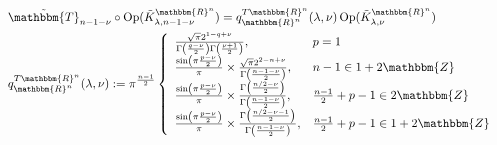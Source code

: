 \documentclass[8pt,pdf,notes]{beamer}
\newcommand{\assign}{:=}
\newcommand{\tmop}[1]{\ensuremath{\operatorname{#1}}}
\theoremstyle{mystyle}
\begin{document}
\begin{frame}
	\begin{theorem}
		\begin{eqnarray*}& \tilde{\mathbbm{T}}_{n - 1 - \nu} \circ \tmop{Op} ( \tilde{K}_{\lambda,
    n - 1 - \nu}^{\mathbbm{R}^n}) = q^{T\mathbbm{R}^n}_{\mathbbm{R}^n} (
    \lambda, \nu) \tmop{Op} ( \tilde{K}_{\lambda, \nu}^{\mathbbm{R}^n}) & 
    \nonumber\\
    & q^{T\mathbbm{R}^n}_{\mathbbm{R}^n} ( \lambda, \nu) \assign \pi^{\frac{n
    - 1}{2}} \left\{ \begin{array}{ll}
      \frac{\sqrt{\pi} 2^{1 - q + \nu}}{\Gamma \left( \frac{q - \nu}{2}
      \right) \Gamma \left( \frac{\nu + 1}{2} \right)}, & p = 1\\
      \frac{\sin \left( \pi \frac{p - \nu}{2} \right)}{\pi} \times
      \frac{\sqrt{\pi} 2^{2 - n + \nu}}{\Gamma \left( \frac{n - 1 - \nu}{2}
      \right)}, & n - 1 \in 1 + 2\mathbbm{Z}\\
      \frac{\sin \left( \pi \frac{p - \nu}{2} \right)}{\pi} \times
      \frac{\Gamma \left( \frac{n / 2 - \nu}{2} \right)}{\Gamma \left( \frac{n
      - 1 - \nu}{2} \right)}, & \frac{n - 1}{2} + p - 1 \in 2\mathbbm{Z}\\
      \frac{\sin \left( \pi \frac{p - \nu}{2} \right)}{\pi} \times
      \frac{\Gamma \left( \frac{n / 2 - \nu - 1}{2} \right)}{\Gamma \left(
      \frac{n - 1 - \nu}{2} \right)}, & \frac{n - 1}{2} + p - 1 \in 1 +
      2\mathbbm{Z}
    \end{array} \right. &  \nonumber\\
		\label{<++>}
	\end{eqnarray*}
	\end{theorem}
\end{frame}
\end{document}
